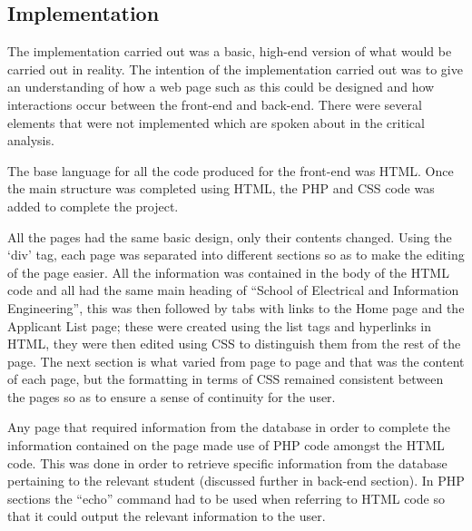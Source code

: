\documentclass[journal]{IEEEtran}
\begin{document}

\subsection{Implementation}
The implementation carried out was a basic, high-end version of what would be carried out in reality. The intention of the implementation carried out was to give an understanding of how a web page such as this could be designed and how interactions occur between the front-end and back-end. There were several elements that were not implemented which are spoken about in the critical analysis.

\hfill \break The base language for all the code produced for the front-end was HTML. Once the main structure was completed using HTML, the PHP and CSS code was added to complete the project. 

\hfill \break All the pages had the same basic design, only their contents changed. Using the `div' tag, each page was separated into different sections so as to make the editing of the page easier. All the information was contained in the body of the HTML code and all had the same main heading of “School of Electrical and Information Engineering”, this was then followed by tabs with links to the Home page and the Applicant List page; these were created using the list tags and hyperlinks in HTML, they were then edited using CSS to distinguish them from the rest of the page. The next section is what varied from page to page and that was the content of each page, but the formatting in terms of CSS remained consistent between the pages so as to ensure a sense of continuity for the user. 

\hfill \break Any page that required information from the database in order to complete the information contained on the page made use of PHP code amongst the HTML code. This was done in order to retrieve specific information from the database pertaining to the relevant student (discussed further in back-end section). In PHP sections the “echo” command had to be used when referring to HTML code so that it could output the relevant information to the user.


\end{document}
